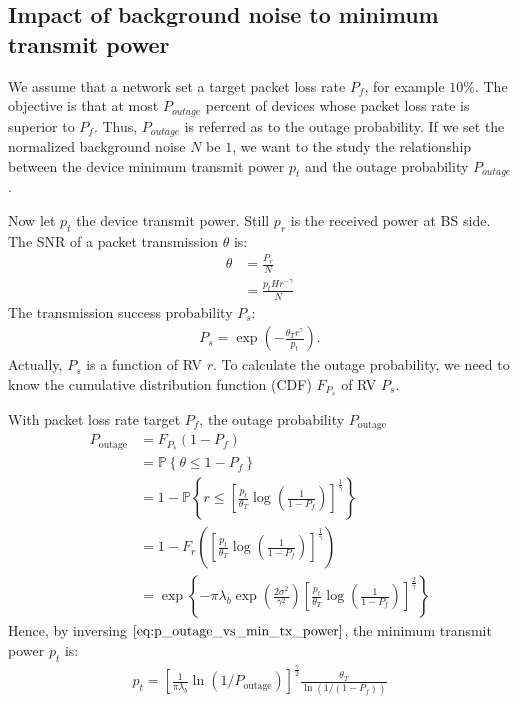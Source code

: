 \subsection{Impact of background noise to minimum transmit power}
We assume that a network set a target packet loss rate $P_f$, for example $10\%$. The objective is that at most $P_{outage}$ percent of devices whose packet loss rate is superior to $P_f$. Thus, $P_{outage}$ is referred as to the outage probability.
If we set the normalized background noise $N$ be $1$, we want to the study the relationship between the device minimum transmit power $p_t$ and the outage probability $P_{outage}$.

Now let $p_t$ the device transmit power. Still $p_r$ is the received power at BS side.  The SNR of a packet transmission $\theta$ is:
\begin{align}
	\theta &= \frac{P_{r}}{N} \\
	&= \frac{p_t H r^{-\gamma}}{N}
\end{align}
The transmission success probability $P_{s}$:
\begin{align}
	P_{s} = \exp( -\frac{ \theta_{T} r^{\gamma}}{p_{t}}).
\end{align}
Actually, $P_{s}$ is a function of RV $r$. To calculate the outage probability, we need to know the cumulative distribution function (CDF) $F_{P_{s}}$ of RV $P_{s}$. 

With packet loss rate target $P_f$, the outage probability $P_{\text{outage}}$
\begin{align}
	\label{eq:p_outage_vs_min_tx_power}
	P_{\text{outage}} &= F_{P_{s}}\left( 1- P_{f} \right)  \nonumber\\
	&= \mathbb{P} \left\lbrace  \theta \leq  1- P_{f}  \right\rbrace  \nonumber\\
	&=  1  -  \mathbb{P} \left\lbrace  r \leq  \left[ \frac{p_t}{\theta_{T}} \log(\frac{1}{ 1- P_{f} })\right] ^{\frac{1}{\gamma}} \right\rbrace \nonumber\\
	&= 1 -F_r \left( \left[ \frac{p_t}{\theta_{T}} \log(\frac{1}{ 1- P_{f} })\right] ^{\frac{1}{\gamma}} \right) \nonumber\\
	&= \exp\left\lbrace -\pi \lambda_{b} \exp\left( \frac{2\sigma^2}{\gamma^2}\right) \left[  \frac{p_t}{\theta_{T}} \log(\frac{1}{ 1- P_{f} })\right]  ^{\frac{2}{\gamma}} \right\rbrace 
\end{align}
Hence, by inversing $\eqref{eq:p_outage_vs_min_tx_power}$, the minimum transmit power $p_t$ is:
\begin{align}
	\label{eq:min_tx_power_vs_p_outage_plr}
	p_t = \left[ \frac{1}{\pi \lambda_{b}} \ln\left( 1/P_{\text{outage}} \right) \right] ^{\frac{\gamma}{2}} \frac{\theta_{T}} {\ln(1/(1-P_{f}))}
\end{align}


